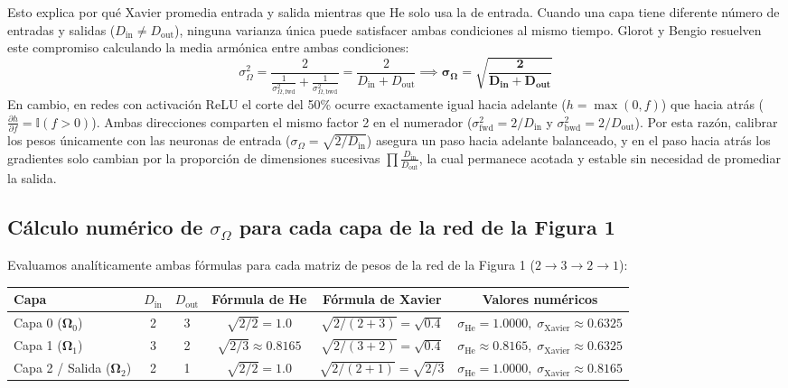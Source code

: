 \documentclass[10pt,a4paper]{article}
\begin{document}
{Esto explica por qué Xavier promedia entrada y salida mientras que He solo usa la de entrada. Cuando una capa tiene diferente número de entradas y salidas ($D_{\text{in}} \neq D_{\text{out}}$), ninguna varianza única puede satisfacer ambas condiciones al mismo tiempo. Glorot y Bengio resuelven este compromiso calculando la media armónica entre ambas condiciones:
\[
\sigma_\Omega^2 = \frac{2}{\frac{1}{\sigma_{\Omega, \text{fwd}}^2} + \frac{1}{\sigma_{\Omega, \text{bwd}}^2}} = \frac{2}{D_{\text{in}} + D_{\text{out}}} \implies \mathbf{\sigma_\Omega = \sqrt{\frac{2}{D_{\text{in}} + D_{\text{out}}}}}
\]
En cambio, en redes con activación ReLU el corte del 50\% ocurre exactamente igual hacia adelante ($h = \max(0, f)$) que hacia atrás ($\frac{\partial h}{\partial f} = \mathbb{I}(f > 0)$). Ambas direcciones comparten el mismo factor 2 en el numerador ($\sigma_{\text{fwd}}^2 = 2/D_{\text{in}}$ y $\sigma_{\text{bwd}}^2 = 2/D_{\text{out}}$). Por esta razón, calibrar los pesos únicamente con las neuronas de entrada ($\sigma_\Omega = \sqrt{2/D_{\text{in}}}$) asegura un paso hacia adelante balanceado, y en el paso hacia atrás los gradientes solo cambian por la proporción de dimensiones sucesivas $\prod \frac{D_{\text{in}}}{D_{\text{out}}}$, la cual permanece acotada y estable sin necesidad de promediar la salida.

\subsection*{Cálculo numérico de $\sigma_\Omega$ para cada capa de la red de la Figura 1}

Evaluamos analíticamente ambas fórmulas para cada matriz de pesos de la red de la Figura 1 ($2 \to 3 \to 2 \to 1$):
\vspace{-0.1cm}
\begin{table}[H]
\centering
\footnotesize
\renewcommand{\arraystretch}{0.75}
\setlength{\tabcolsep}{5pt}
\begin{tabular}{lccccc}
\toprule
\textbf{Capa} & $D_{\text{in}}$ & $D_{\text{out}}$ & \textbf{Fórmula de He} & \textbf{Fórmula de Xavier} & \textbf{Valores numéricos} \\
\midrule
Capa 0 ($\boldsymbol{\Omega}_0$) & 2 & 3 & $\sqrt{2/2} = 1.0$ & $\sqrt{2/(2+3)} = \sqrt{0.4}$ & $\sigma_{\text{He}} = \mathbf{1.0000}, \; \sigma_{\text{Xavier}} \approx \mathbf{0.6325}$ \\
Capa 1 ($\boldsymbol{\Omega}_1$) & 3 & 2 & $\sqrt{2/3} \approx 0.8165$ & $\sqrt{2/(3+2)} = \sqrt{0.4}$ & $\sigma_{\text{He}} \approx \mathbf{0.8165}, \; \sigma_{\text{Xavier}} \approx \mathbf{0.6325}$ \\
Capa 2 / Salida ($\boldsymbol{\Omega}_2$) & 2 & 1 & $\sqrt{2/2} = 1.0$ & $\sqrt{2/(2+1)} = \sqrt{2/3}$ & $\sigma_{\text{He}} = \mathbf{1.0000}, \; \sigma_{\text{Xavier}} \approx \mathbf{0.8165}$ \\
\bottomrule
\end{tabular}
\end{table}
\vspace{-0.15cm}

}
\end{document}
